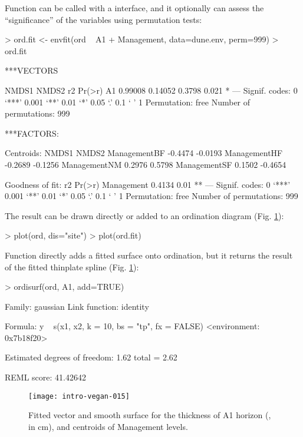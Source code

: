 \documentclass[a4paper,10pt]{article}
\begin{document}
Function  can be called with a 
interface, and it optionally can assess the ``significance'' of the
variables using permutation tests:
\begin{Schunk}
\begin{Sinput}
> ord.fit <- envfit(ord ~ A1 + Management, data=dune.env, perm=999)
> ord.fit
\end{Sinput}
\begin{Soutput}
***VECTORS

     NMDS1   NMDS2     r2 Pr(>r)  
A1 0.99008 0.14052 0.3798  0.021 *
---
Signif. codes:  0 ‘***’ 0.001 ‘**’ 0.01 ‘*’ 0.05 ‘.’ 0.1 ‘ ’ 1
Permutation: free
Number of permutations: 999

***FACTORS:

Centroids:
               NMDS1   NMDS2
ManagementBF -0.4474 -0.0193
ManagementHF -0.2689 -0.1256
ManagementNM  0.2976  0.5798
ManagementSF  0.1502 -0.4654

Goodness of fit:
               r2 Pr(>r)   
Management 0.4134   0.01 **
---
Signif. codes:  0 ‘***’ 0.001 ‘**’ 0.01 ‘*’ 0.05 ‘.’ 0.1 ‘ ’ 1
Permutation: free
Number of permutations: 999
\end{Soutput}
\end{Schunk}
The result can be drawn directly or added to an ordination diagram
(Fig. \ref{fig:envfit}):
\begin{Schunk}
\begin{Sinput}
> plot(ord, dis="site")
> plot(ord.fit)
\end{Sinput}
\end{Schunk}

Function  directly adds a fitted surface onto
ordination, but it returns the result of the fitted thinplate spline
 (Fig. \ref{fig:envfit}):
\begin{Schunk}
\begin{Sinput}
> ordisurf(ord, A1, add=TRUE)
\end{Sinput}
\begin{Soutput}
Family: gaussian 
Link function: identity 

Formula:
y ~ s(x1, x2, k = 10, bs = "tp", fx = FALSE)
<environment: 0x7b18f20>

Estimated degrees of freedom:
1.62  total = 2.62 

REML score: 41.42642     
\end{Soutput}
\end{Schunk}
\begin{figure}
\texttt{[image: intro-vegan-015]}
\caption{Fitted vector and smooth surface for the thickness of A1
  horizon (, in cm), and centroids of Management levels.}
\label{fig:envfit}
\end{figure}
\end{document}
